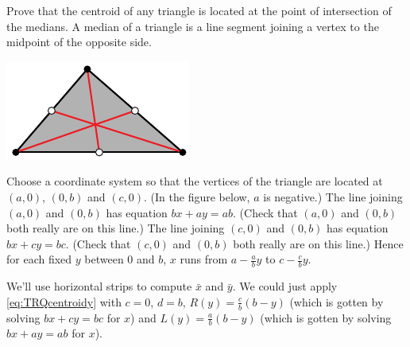 \begin{eg}\label{eg:TRQcentroidC}
Prove that the centroid of any triangle
is located at the point of intersection of the medians.
A median of a triangle is a line segment joining a vertex
to the midpoint of the opposite side.

\begin{efig}
\begin{center}
    \includegraphics{medianA}
\end{center}
\end{efig}


\soln Choose a coordinate system so that the vertices of the triangle
are located at $(a,0)$, $(0,b)$ and $(c,0)$. (In the figure below,
$a$ is negative.)%
The line joining $(a,0)$ and $(0,b)$ has equation $bx+ay=ab$.
(Check that $(a,0)$ and $(0,b)$ both really are on this line.)
The line joining $(c,0)$ and $(0,b)$ has equation $bx+cy=bc$.
(Check that $(c,0)$ and $(0,b)$ both really are on this line.)
Hence for each fixed $y$ between $0$ and $b$, $x$ runs from
$a-\frac{a}{b}y$ to $c-\frac{c}{b}y$.


We'll use horizontal strips to compute $\bar x$ and $\bar y$. We could
just apply \eqref{eq:TRQcentroidy} with $c=0$, $d=b$,
$R(y)= \frac{c}{b}(b-y)$ (which is gotten by solving $bx+cy=bc$ for $x$) and
$L(y)= \frac{a}{b}(b-y)$ (which is gotten by solving $bx+ay=ab$ for $x$).


\end{eg}
